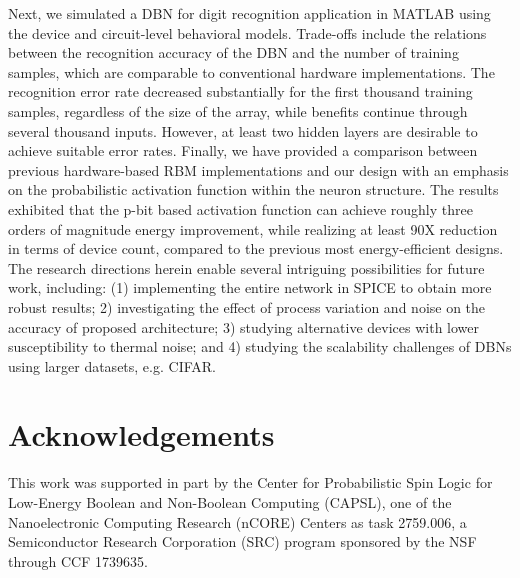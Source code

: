 Next, we simulated a DBN for digit recognition application in MATLAB using the device and circuit-level behavioral models. Trade-offs include the relations between the recognition accuracy of the DBN and the number of training samples, which are comparable to conventional hardware implementations. The recognition error rate decreased substantially for the first thousand training samples, regardless of the size of the array, while benefits continue through several thousand inputs. However, at least two hidden layers are desirable to achieve suitable error rates. Finally, we have provided a comparison between previous hardware-based RBM implementations and our design with an emphasis on the probabilistic activation function within the neuron structure. The results exhibited that the p-bit based activation function can achieve roughly three orders of magnitude energy improvement, while realizing at least 90X reduction in terms of device count, compared to the previous most energy-efficient designs. The research directions herein enable several intriguing possibilities for future work, including: (1) implementing the entire network in SPICE to obtain more robust results; 2) investigating the effect of process variation and noise on the accuracy of proposed architecture; 3) studying alternative devices with lower susceptibility to thermal noise; and 4) studying the scalability challenges of DBNs using larger datasets, e.g. CIFAR.  


\section{Acknowledgements}
This work was supported in part by the Center for Probabilistic Spin Logic for Low-Energy Boolean and Non-Boolean Computing  (CAPSL), one of the Nanoelectronic Computing Research (nCORE) Centers as task 2759.006, a Semiconductor Research Corporation (SRC) program sponsored by the NSF through CCF 1739635.



